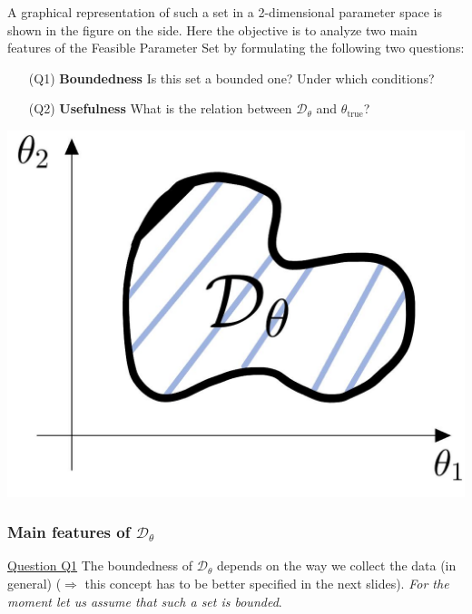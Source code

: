 \begin{multicols}{2}
    \noindent
    A graphical representation of such a set in a 2-dimensional parameter space is shown in the figure on the side. Here the objective is to analyze two main features of the Feasible Parameter Set by formulating the following two questions:  
    \normalsize{
    \begin{itemize}
        \itemsep-0.2em
        \item[(Q1)] \textsf{\textbf{\color{red}Boundedness}} Is this set a bounded one? Under which conditions?
        \item[(Q2)] \textsf{\textbf{\color{red}Usefulness}} What is the relation between $\mathcal{D}_\theta$ and $\theta_{\text{true}}$?
    \end{itemize}}
    \newcolumn
    \begin{center}
        \includegraphics[scale=0.18]{img/FPS_1.jpeg}
    \end{center}
\end{multicols}
\subsubsection{Main features of $\mathcal{D}_\theta$}


\noindent
\textsf{\underline{Question Q1}} The boundedness of $\mathcal{D}_\theta$ depends on the way we collect the data (in general) ($\Rightarrow$ this concept has to be better specified in the next slides). \textit{For the moment let us assume that such a set is bounded}.\\

